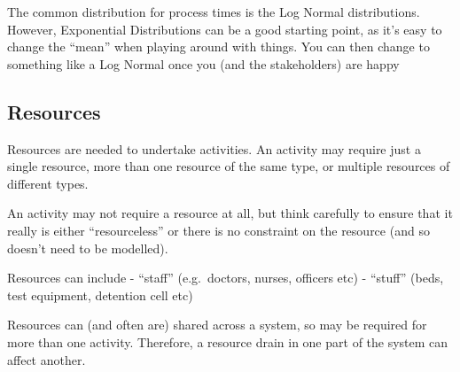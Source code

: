 \documentclass[
  letterpaper,
  DIV=11,
  numbers=noendperiod]{scrreprt}
\begin{document}
\begin{tcolorbox}[enhanced jigsaw, rightrule=.15mm, colback=white, colframe=quarto-callout-tip-color-frame, colbacktitle=quarto-callout-tip-color!10!white, toprule=.15mm, coltitle=black, opacityback=0, titlerule=0mm, bottomtitle=1mm, breakable, title=\textcolor{quarto-callout-tip-color}{\faLightbulb}\hspace{0.5em}{Tip}, opacitybacktitle=0.6, toptitle=1mm, arc=.35mm, bottomrule=.15mm, leftrule=.75mm, left=2mm]

The common distribution for process times is the Log Normal
distributions. However, Exponential Distributions can be a good starting
point, as it's easy to change the ``mean'' when playing around with
things. You can then change to something like a Log Normal once you (and
the stakeholders) are happy

\end{tcolorbox}

\subsection{Resources}\label{resources}

Resources are needed to undertake activities. An activity may require
just a single resource, more than one resource of the same type, or
multiple resources of different types.

\begin{tcolorbox}[enhanced jigsaw, rightrule=.15mm, colback=white, colframe=quarto-callout-tip-color-frame, colbacktitle=quarto-callout-tip-color!10!white, toprule=.15mm, coltitle=black, opacityback=0, titlerule=0mm, bottomtitle=1mm, breakable, title=\textcolor{quarto-callout-tip-color}{\faLightbulb}\hspace{0.5em}{Tip}, opacitybacktitle=0.6, toptitle=1mm, arc=.35mm, bottomrule=.15mm, leftrule=.75mm, left=2mm]

An activity may not require a resource at all, but think carefully to
ensure that it really is either ``resourceless'' or there is no
constraint on the resource (and so doesn't need to be modelled).

Resources can include - ``staff'' (e.g.~doctors, nurses, officers etc) -
``stuff'' (beds, test equipment, detention cell etc)

\end{tcolorbox}

Resources can (and often are) shared across a system, so may be required
for more than one activity. Therefore, a resource drain in one part of
the system can affect another.
\end{document}
